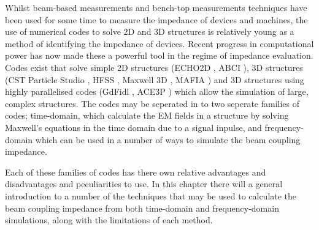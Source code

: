 Whilst beam-based measurements and bench-top measurements techniques have been used for some time to measure the impedance of devices and machines, the use of numerical codes to solve 2D and 3D structures is relatively young as a method of identifying the impedance of devices. Recent progress in computational power has now made these a powerful tool in the regime of impedance evaluation. Codes exist that solve simple 2D structures (ECHO2D \cite{Weiland:Echo2d}, ABCI \cite{Chin:ABCI}), 3D structures (CST Particle Studio \cite{cst}, HFSS \cite{hfss}, Maxwell 3D \cite{maxwell}, MAFIA \cite{Weiland:MAFIAv4}) and 3D structures using highly parallelised codes (GdFidl \cite{gdfidl}, ACE3P \cite{Ng:Ace3p}) which allow the simulation of large, complex structures. The codes may be seperated in to two seperate families of codes; time-domain, which calculate the EM fields in a structure by solving Maxwell's equations in the time domain due to a signal inpulse, and frequency-domain which can be used in a number of ways to simulate the beam coupling impedance.

Each of these families of codes has there own relative advantages and disadvantages and peculiarities to use. In this chapter there will a general introduction to a number of the techniques that may be used to calculate the beam coupling impedance from both time-domain and frequency-domain simulations, along with the limitations of each method.